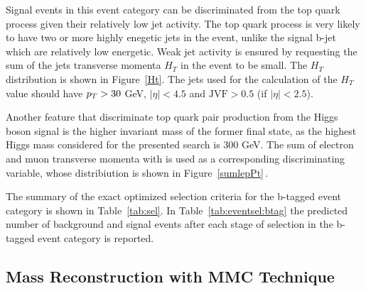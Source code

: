 Signal events in this event category can be discriminated from the top quark process given their relatively low jet activity. 
The top quark process is very likely to have two or more highly enegetic jets in the event, unlike the signal
b-jet which are relatively low energetic.
Weak jet activity is ensured by requesting the sum of the jets transverse momenta $H_T$  in the event to be small.
The $H_T$ distribution is shown in Figure~\ref{Ht}. The jets used for the calculation of the $H_T$ value 
should have $p_{T} > 30 $ GeV, $|\eta| < 4.5$  and $\text{JVF} > 0.5 $ (if $|\eta| < 2.5$).

Another feature that discriminate top quark  pair production from the Higgs boson signal is the higher invariant mass of the former final state, 
as the highest Higgs mass considered for the presented  search is 300 GeV.
The sum of electron and muon transverse momenta with \met is  used as 
a corresponding discriminating variable, whose distribiution is shown in Figure~\ref{sumlepPt}$\,.$

The summary of the exact optimized selection criteria for the b-tagged event category is shown in Table~\ref{tab:sel}.
In Table~\ref{tab:eventsel:btag} the predicted number of background and signal events after each stage of selection 
in the b-tagged event category  is reported.






\subsection{Mass Reconstruction with MMC Technique}\label{sec:mmc}

